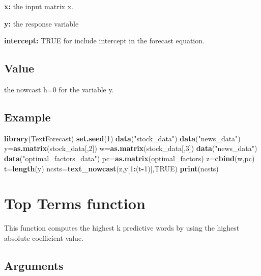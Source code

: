 \documentclass[]{article}
\newenvironment{Shaded}{\begin{snugshade}}{\end{snugshade}}
\newcommand{\KeywordTok}[1]{\textcolor[rgb]{0.13,0.29,0.53}{\textbf{#1}}}
\newcommand{\DecValTok}[1]{\textcolor[rgb]{0.00,0.00,0.81}{#1}}
\newcommand{\StringTok}[1]{\textcolor[rgb]{0.31,0.60,0.02}{#1}}
\newcommand{\OtherTok}[1]{\textcolor[rgb]{0.56,0.35,0.01}{#1}}
\newcommand{\OperatorTok}[1]{\textcolor[rgb]{0.81,0.36,0.00}{\textbf{#1}}}
\newcommand{\NormalTok}[1]{#1}
\begin{document}
\textbf{x:} the input matrix x.

\textbf{y:} the response variable

\textbf{intercept:} TRUE for include intercept in the forecast equation.

\subsection{Value}\label{value-9}

the nowcast h=0 for the variable y.

\subsection{Example}\label{example-9}

\begin{Shaded}
\begin{Highlighting}[]
 \KeywordTok{library}\NormalTok{(TextForecast)}
 \KeywordTok{set.seed}\NormalTok{(}\DecValTok{1}\NormalTok{)}
 \KeywordTok{data}\NormalTok{(}\StringTok{"stock_data"}\NormalTok{)}
  \KeywordTok{data}\NormalTok{(}\StringTok{"news_data"}\NormalTok{)}
\NormalTok{ y=}\KeywordTok{as.matrix}\NormalTok{(stock_data[,}\DecValTok{2}\NormalTok{])}
\NormalTok{ w=}\KeywordTok{as.matrix}\NormalTok{(stock_data[,}\DecValTok{3}\NormalTok{])}
 \KeywordTok{data}\NormalTok{(}\StringTok{"news_data"}\NormalTok{)}
 \KeywordTok{data}\NormalTok{(}\StringTok{"optimal_factors_data"}\NormalTok{)}
\NormalTok{ pc=}\KeywordTok{as.matrix}\NormalTok{(optimal_factors)}
\NormalTok{ z=}\KeywordTok{cbind}\NormalTok{(w,pc)}
\NormalTok{ t=}\KeywordTok{length}\NormalTok{(y)}
\NormalTok{ ncsts=}\KeywordTok{text_nowcast}\NormalTok{(z,y[}\DecValTok{1}\OperatorTok{:}\NormalTok{(t}\OperatorTok{-}\DecValTok{1}\NormalTok{)],}\OtherTok{TRUE}\NormalTok{)}
 \KeywordTok{print}\NormalTok{(ncsts)}
\end{Highlighting}
\end{Shaded}

\section{Top Terms function}\label{top-terms-function}

This function computes the highest k predictive words by using the
highest absolute coefficient value.

\subsection{Arguments}\label{arguments-10}
\end{document}
